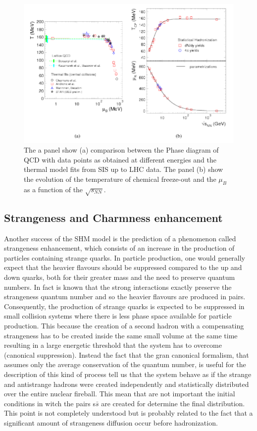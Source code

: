 \documentclass[12pt,a4paper]{book}
\begin{document}
\begin{figure}
		\includegraphics[width=0.8 \linewidth]{pictures/shm_qcd_comparison.png}
		\caption{ The a panel show (a) comparison between the Phase diagram of QCD with data points as obtained at different energies and the thermal model fits from SIS up to LHC data. The panel (b) show the evolution of the temperature of chemical freeze-out and the $\mu_B$ as a function of the $\sqrt{s_{NN}}$.\cite{Andronic_2017}}
		\label{fig:shm_qcd_comparison}
		
	\end{figure}
	
	\subsection{Strangeness and Charmness enhancement}
	Another success of the SHM model is the prediction of a phenomenon called strangeness enhancement, which consists of an increase in the production of particles containing strange quarks.
	In particle production, one would generally expect that the heavier flavours should be suppressed compared to the up and down quarks, both for their greater mass and the need to preserve quantum numbers. In fact is known that the strong interactions exactly preserve the strangeness quantum number and so the heavier flavours are produced in pairs. Consequently, the production of strange quarks is expected to be suppressed in small collision systems where there is less phase space available for particle production. This because the creation of a second hadron with a compensating strangeness has to be created inside the same small volume at the same time resulting in a large energetic threshold that the system has to overcome (canonical suppression). Instead the fact that the gran canonical formalism, that assumes only the average conservation of the quantum number, is useful for the description of this kind of process tell us that the system behave as if the strange and antistrange hadrons were created independently and statistically distributed over the entire nuclear fireball. This mean that are not important the initial conditions in witch the pairs s$\bar{s}$ are created for determine the final distribution. This point is not completely understood but is probably related to the fact that a significant amount of strangeness diffusion occur before hadronization.
	
\end{document}
